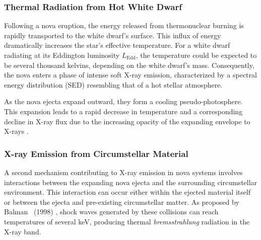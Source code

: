 			
			\subsubsection{Thermal Radiation from Hot White Dwarf}
				Following a nova eruption, the energy released from thermonuclear burning is rapidly transported to the white dwarf's surface. This influx of energy dramatically increases the star's effective temperature. For a white dwarf radiating at its Eddington luminosity $L_\text{Edd}$, the temperature could be expected to be several thousand kelvins, depending on the white dwarf's mass. Consequently, the nova enters a phase of intense soft X-ray emission, characterized by a spectral energy distribution (SED) resembling that of a hot stellar atmosphere.
				
				As the nova ejecta expand outward, they form a cooling pseudo-photosphere. This expansion leads to a rapid decrease in temperature and a corresponding decline in X-ray flux due to the increasing opacity of the expanding envelope to X-rays \cite{krautter96}.
				
			\subsubsection{X-ray Emission from Circumstellar Material}
				A second mechanism contributing to X-ray emission in nova systems involves interactions between the expanding nova ejecta and the surrounding circumstellar environment. This interaction can occur either within the ejected material itself or between the ejecta and pre-existing circumstellar matter. As proposed by Balman \etal\ (1998) \cite{balman98}, shock waves generated by these collisions can reach temperatures of several keV, producing thermal \textit{bremsstrahlung} radiation in the X-ray band.

